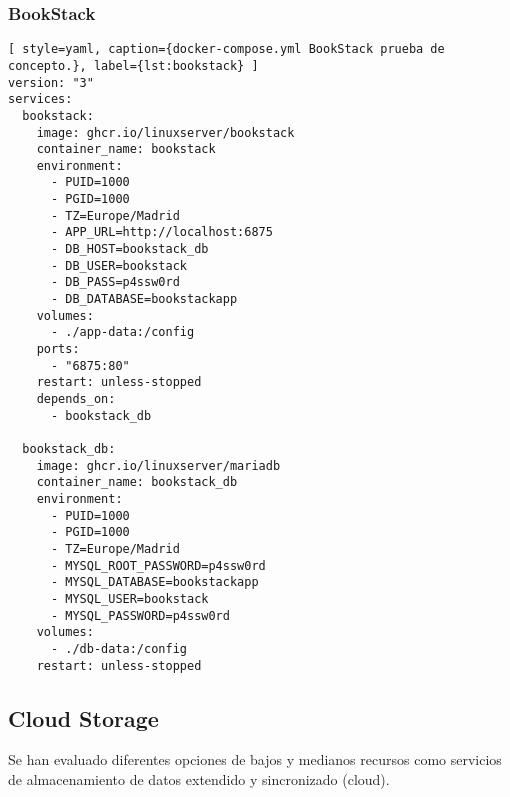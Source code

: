 \subsubsection{BookStack}

\begin{lstlisting}[ style=yaml, caption={docker-compose.yml BookStack prueba de concepto.}, label={lst:bookstack} ]
version: "3"
services:
  bookstack:
    image: ghcr.io/linuxserver/bookstack
    container_name: bookstack
    environment:
      - PUID=1000
      - PGID=1000
      - TZ=Europe/Madrid  
      - APP_URL=http://localhost:6875   
      - DB_HOST=bookstack_db
      - DB_USER=bookstack
      - DB_PASS=p4ssw0rd
      - DB_DATABASE=bookstackapp
    volumes:
      - ./app-data:/config
    ports:
      - "6875:80"
    restart: unless-stopped
    depends_on:
      - bookstack_db

  bookstack_db:
    image: ghcr.io/linuxserver/mariadb
    container_name: bookstack_db
    environment:
      - PUID=1000
      - PGID=1000
      - TZ=Europe/Madrid    
      - MYSQL_ROOT_PASSWORD=p4ssw0rd
      - MYSQL_DATABASE=bookstackapp
      - MYSQL_USER=bookstack
      - MYSQL_PASSWORD=p4ssw0rd
    volumes:
      - ./db-data:/config
    restart: unless-stopped
\end{lstlisting}

\subsection{Cloud Storage}
Se han evaluado diferentes opciones de bajos y medianos recursos como servicios de almacenamiento de datos extendido y sincronizado (cloud).

